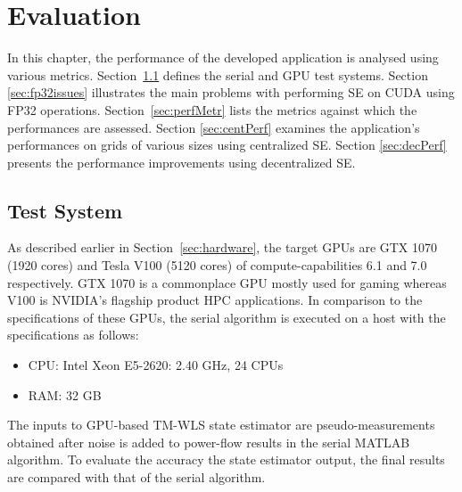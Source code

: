 \documentclass[thesis.tex]{subfiles}
\begin{document}
\chapter{Evaluation}\label{chap:eva}

In this chapter, the performance of the developed application is analysed using various metrics. Section~\ref{sec:testsystem} defines the serial and GPU test systems. Section \ref{sec:fp32issues} illustrates the main problems with performing SE on CUDA using FP32 operations. Section~\ref{sec:perfMetr} lists the metrics against which the performances are assessed. Section \ref{sec:centPerf} examines the application’s performances on grids of various sizes using centralized SE. Section \ref{sec:decPerf} presents the performance improvements using decentralized SE.

\section{Test System} \label{sec:testsystem}
As described earlier in Section~\ref{sec:hardware}, the target GPUs are GTX 1070 (1920 cores) and Tesla V100 (5120 cores) of compute-capabilities 6.1 and 7.0 respectively. GTX 1070 is a commonplace GPU mostly used for gaming whereas V100 is NVIDIA’s flagship product HPC applications. In comparison to the specifications of these GPUs, the serial algorithm is executed on a host with the specifications as follows:
\begin{itemize}
	\item CPU: Intel Xeon E5-2620: 2.40 GHz, 24 CPUs
	\item RAM: 32 GB
\end{itemize}
The inputs to GPU-based TM-WLS state estimator are pseudo-measurements obtained after noise is added to power-flow results in the serial MATLAB algorithm. To evaluate the accuracy the state estimator output, the final results are compared with that of the serial algorithm.
\end{document}
